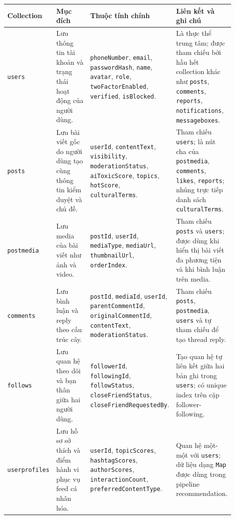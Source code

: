 {\def\LTcaptype{none}
\begin{longtable}{
  |>{\raggedright\arraybackslash}p{0.16\linewidth}
  |>{\raggedright\arraybackslash}p{0.26\linewidth}
  |>{\raggedright\arraybackslash}p{0.25\linewidth}
  |>{\raggedright\arraybackslash}p{0.25\linewidth}|}
\hline
\textbf{Collection} & \textbf{Mục đích} & \textbf{Thuộc tính chính} & \textbf{Liên kết và ghi chú} \\ \hline
\endhead
\hline
\endlastfoot
\texttt{users} & Lưu thông tin tài khoản và trạng thái hoạt động của người dùng. & \texttt{phoneNumber}, \texttt{email}, \texttt{passwordHash}, \texttt{name}, \texttt{avatar}, \texttt{role}, \texttt{twoFactorEnabled}, \texttt{verified}, \texttt{isBlocked}. & Là thực thể trung tâm; được tham chiếu bởi hầu hết collection khác như \texttt{posts}, \texttt{comments}, \texttt{reports}, \texttt{notifications}, \texttt{messageboxes}. \\ \hline
\texttt{posts} & Lưu bài viết gốc do người dùng tạo cùng thông tin kiểm duyệt và chủ đề. & \texttt{userId}, \texttt{contentText}, \texttt{visibility}, \texttt{moderationStatus}, \texttt{aiToxicScore}, \texttt{topics}, \texttt{hotScore}, \texttt{culturalTerms}. & Tham chiếu \texttt{users}; là nút cha của \texttt{postmedia}, \texttt{comments}, \texttt{likes}, \texttt{reports}; nhúng trực tiếp danh sách \texttt{culturalTerms}. \\ \hline
\texttt{postmedia} & Lưu media của bài viết như ảnh và video. & \texttt{postId}, \texttt{userId}, \texttt{mediaType}, \texttt{mediaUrl}, \texttt{thumbnailUrl}, \texttt{orderIndex}. & Tham chiếu \texttt{posts} và \texttt{users}; được dùng khi hiển thị bài viết đa phương tiện và khi bình luận trên media. \\ \hline
\texttt{comments} & Lưu bình luận và reply theo cấu trúc cây. & \texttt{postId}, \texttt{mediaId}, \texttt{userId}, \texttt{parentCommentId}, \texttt{originalCommentId}, \texttt{contentText}, \texttt{moderationStatus}. & Tham chiếu \texttt{posts}, \texttt{postmedia}, \texttt{users} và tự tham chiếu để tạo thread reply. \\ \hline
\texttt{follows} & Lưu quan hệ theo dõi và bạn thân giữa hai người dùng. & \texttt{followerId}, \texttt{followingId}, \texttt{followStatus}, \texttt{closeFriendStatus}, \texttt{closeFriendRequestedBy}. & Tạo quan hệ tự liên kết giữa hai bản ghi trong \texttt{users}; có unique index trên cặp follower-following. \\ \hline
\texttt{userprofiles} & Lưu hồ sơ sở thích và điểm hành vi phục vụ feed cá nhân hóa. & \texttt{userId}, \texttt{topicScores}, \texttt{hashtagScores}, \texttt{authorScores}, \texttt{interactionCount}, \texttt{preferredContentType}. & Quan hệ một-một với \texttt{users}; dữ liệu dạng \texttt{Map} được dùng trong pipeline recommendation. \\ \hline

\end{longtable}}
